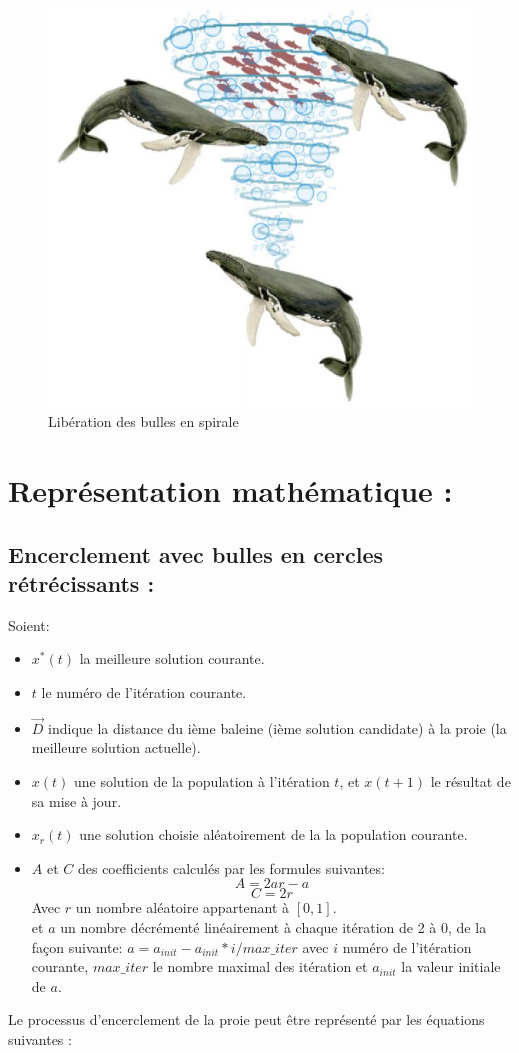 \documentclass[class=article, crop=false]{standalone}
\begin{document}
\begin{figure}[H] 
    \includegraphics[width=\linewidth]{../figures/spiral.png}
    \caption{Libération des bulles en spirale}
\end{figure}

\section{Représentation mathématique :}
\subsection{Encerclement avec bulles en cercles rétrécissants :}
Soient:
\begin{itemize}
    \item \(x^*(t)\) la meilleure solution courante.
    \item \(t\) le numéro de l'itération courante.
    \item \(\vec{D}\) indique la distance du ième baleine (ième solution candidate) à la proie (la meilleure solution actuelle).
    \item \(x(t)\) une solution de la population à l'itération \(t\), et \(x(t+1)\) le résultat de sa mise à jour.
    \item \(x_r(t)\) une solution choisie aléatoirement de la la population courante.
    \item \(A\) et \(C\) des coefficients calculés par les formules suivantes:
    \[A = 2ar-a\] 
    \[C = 2r\] 
    Avec \(r\) un nombre aléatoire appartenant à \([0,1]\).
    \\ et \(a\) un nombre décrémenté linéairement à chaque itération de 2 à 0, de la façon suivante:
    \(a =  a_{init} - a_{init}*i/max\_iter\) avec \(i\) numéro de l’itération courante, \(max\_iter\) le nombre maximal des itération et \(a_{init}\) la valeur initiale de \(a\).
\end{itemize}
Le processus d’encerclement de la proie peut être représenté par les équations suivantes :
\end{document}
